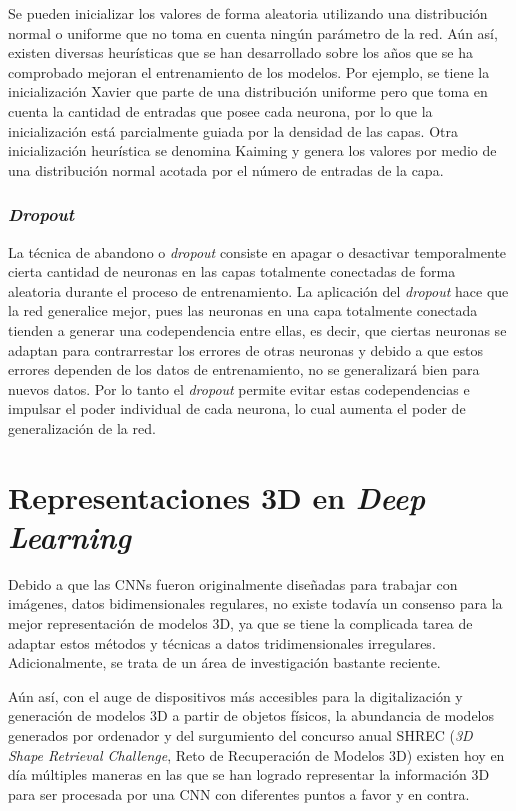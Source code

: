 Se pueden inicializar los valores de forma aleatoria utilizando una distribución normal o uniforme que no toma en cuenta ningún parámetro de la red. Aún así, existen diversas heurísticas que se han desarrollado sobre los años que se ha comprobado mejoran el entrenamiento de los modelos. Por ejemplo, se tiene la inicialización Xavier \cite{glorot2010understanding} que parte de una distribución uniforme pero que toma en cuenta la cantidad de entradas que posee cada neurona, por lo que la inicialización está parcialmente guiada por la densidad de las capas. Otra inicialización heurística se denomina Kaiming \cite{he2015delving} y genera los valores por medio de una distribución normal acotada por el número de entradas de la capa.

\subsubsection{\textit{Dropout}}
La técnica de abandono o \textit{dropout} consiste en apagar o desactivar temporalmente cierta cantidad de neuronas en las capas totalmente conectadas de forma aleatoria durante el proceso de entrenamiento. La aplicación del \textit{dropout} hace que la red generalice mejor, pues las neuronas en una capa totalmente conectada tienden a generar una codependencia entre ellas, es decir, que ciertas neuronas se adaptan para contrarrestar los errores de otras neuronas y debido a que estos errores dependen de los datos de entrenamiento, no se generalizará bien para nuevos datos. Por lo tanto el \textit{dropout} permite evitar estas codependencias e impulsar el poder individual de cada neurona, lo cual aumenta el poder de generalización de la red.

\section{Representaciones 3D en \textit{Deep Learning}}
\label{3d_reps}
Debido a que las CNNs fueron originalmente diseñadas para trabajar con imágenes, datos bidimensionales regulares, no existe todavía un consenso para la mejor representación de modelos 3D, ya que se tiene la complicada tarea de adaptar estos métodos y técnicas a datos tridimensionales irregulares. Adicionalmente, se trata de un área de investigación bastante reciente.

Aún así, con el auge de dispositivos más accesibles para la digitalización y generación de modelos 3D a partir de objetos físicos, la abundancia de modelos generados por ordenador y del surgumiento del concurso anual SHREC \cite{noauthor_shrec2022_nodate} (\textit{3D Shape Retrieval Challenge}, Reto de Recuperación de Modelos 3D) existen hoy en día múltiples maneras en las que se han logrado representar la información 3D para ser procesada por una CNN con diferentes puntos a favor y en contra.

